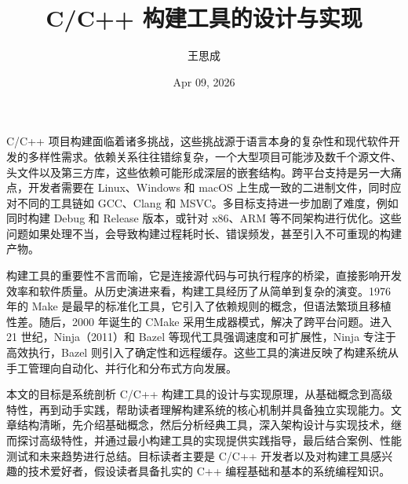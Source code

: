 \title{C/C++ 构建工具的设计与实现}
\author{王思成}
\date{Apr 09, 2026}
\maketitle
C/C++ 项目构建面临着诸多挑战，这些挑战源于语言本身的复杂性和现代软件开发的多样性需求。依赖关系往往错综复杂，一个大型项目可能涉及数千个源文件、头文件以及第三方库，这些依赖可能形成深层的嵌套结构。跨平台支持是另一大痛点，开发者需要在 Linux、Windows 和 macOS 上生成一致的二进制文件，同时应对不同的工具链如 GCC、Clang 和 MSVC。多目标支持进一步加剧了难度，例如同时构建 Debug 和 Release 版本，或针对 x86、ARM 等不同架构进行优化。这些问题如果处理不当，会导致构建过程耗时长、错误频发，甚至引入不可重现的构建产物。\par
构建工具的重要性不言而喻，它是连接源代码与可执行程序的桥梁，直接影响开发效率和软件质量。从历史演进来看，构建工具经历了从简单到复杂的演变。1976 年的 Make 是最早的标准化工具，它引入了依赖规则的概念，但语法繁琐且移植性差。随后，2000 年诞生的 CMake 采用生成器模式，解决了跨平台问题。进入 21 世纪，Ninja（2011）和 Bazel 等现代工具强调速度和可扩展性，Ninja 专注于高效执行，Bazel 则引入了确定性和远程缓存。这些工具的演进反映了构建系统从手工管理向自动化、并行化和分布式方向发展。\par
本文的目标是系统剖析 C/C++ 构建工具的设计与实现原理，从基础概念到高级特性，再到动手实践，帮助读者理解构建系统的核心机制并具备独立实现能力。文章结构清晰，先介绍基础概念，然后分析经典工具，深入架构设计与实现技术，继而探讨高级特性，并通过最小构建工具的实现提供实践指导，最后结合案例、性能测试和未来趋势进行总结。目标读者主要是 C/C++ 开发者以及对构建工具感兴趣的技术爱好者，假设读者具备扎实的 C++ 编程基础和基本的系统编程知识。\par
